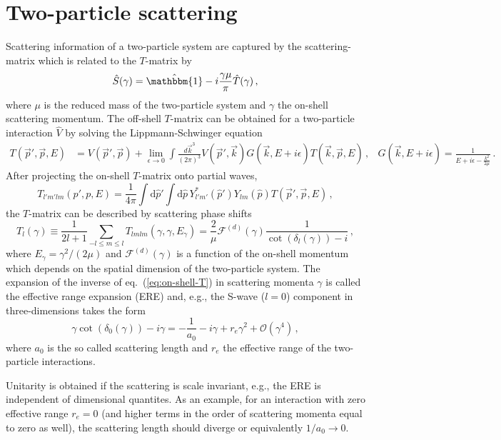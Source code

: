 \section{Two-particle scattering}

Scattering information of a two-particle system are captured by the scattering-matrix which is related to the $T$-matrix by
\begin{equation}
    \hat S(\gamma)
    =
    \hat{\mathbbm{1}}
    -
    i \frac{\gamma \mu}{\pi} \hat T(\gamma)\, ,
\end{equation}
where $\mu$ is the reduced mass of the two-particle system and $\gamma$ the on-shell scattering momentum.
The off-shell $T$-matrix can be obtained for a two-particle interaction $\hat V$ by solving the Lippmann-Schwinger equation
\begin{align}
	T(\vec p', \vec p, E)
	&=
	V(\vec p', \vec p) + \lim\limits_{\epsilon \to 0}\int \frac{d \vec k^3}{(2\pi)^3} V(\vec p', \vec k) G(\vec k, E + i \epsilon) T(\vec k, \vec p, E) \, ,
	&
	G(\vec k, E+ i \epsilon) = \frac{1}{E + i \epsilon - \frac{k^2}{2\mu}}
	\, .
\end{align}
After projecting the on-shell $T$-matrix onto partial waves,
\begin{equation}
    T_{l' m' l m}(p', p, E)
    =
    \frac{1}{4\pi}
    \int \mathrm{d} \hat p' \int \mathrm{d} \hat p \,
    Y_{l'm'}^*(\hat p') Y_{lm}(\hat p)
    T(\vec p', \vec p, E)
    \, ,
\end{equation}
the $T$-matrix can be described by scattering phase shifts
\begin{equation}\label{eq:on-shell-T}
	T_l(\gamma) \equiv \frac{1}{2l+1} \sum_{-l \leq m \leq l} T_{l m l m}(\gamma, \gamma , E_\gamma)
    = \frac{2}{\mu}
    \mathcal F^{(d)}(\gamma) \frac{1}{\cot (\delta_l(\gamma)) - i} \, ,
\end{equation}
where $E_\gamma = \gamma^2 / (2 \mu)$ and $\mathcal F^{(d)}(\gamma)$ is a function of the on-shell momentum which depends on the spatial dimension of the two-particle system.
The expansion of the inverse of eq.~(\ref{eq:on-shell-T}) in scattering momenta $\gamma$ is called the effective range expansion (ERE) and, e.g., the S-wave ($l=0$) component in three-dimensions takes the form
\begin{equation}
    \gamma \cot (\delta_0(\gamma)) - i \gamma
    =
    - \frac{1}{a_0}  - i \gamma + r_e \gamma^2 + \mathcal{O}(\gamma^4)\,,
\end{equation}
where $a_0$ is the so called scattering length and $r_e$ the effective range of the two-particle interactions.

Unitarity is obtained if the scattering is scale invariant, e.g., the ERE is independent of dimensional quantites.
As an example, for an interaction with zero effective range $r_e = 0$ (and higher terms in the order of scattering momenta equal to zero as well), the scattering length should diverge or equivalently $1/a_0 \to 0$.
